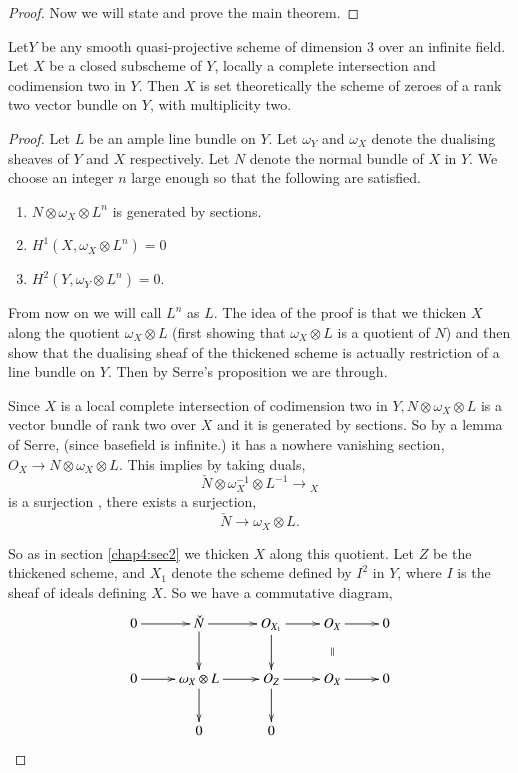 \begin{proof}
Now we will state and prove the main theorem.
\end{proof}

\begin{THM*}
Let\pageoriginale $Y$ be any smooth quasi-projective scheme of
dimension 3 over an infinite field. Let $X$ be a closed subscheme of
$Y$, locally a complete intersection and codimension two in $Y$. Then
$X$ is set theoretically the scheme of zeroes of a rank two vector
bundle on $Y$, with multiplicity two.
\end{THM*}

\begin{proof}
Let $L$ be an ample line bundle on $Y$. Let $\omega_Y$ and $\omega_X$
denote the dualising sheaves of $Y$ and $X$ respectively. Let $N$
denote the normal bundle of $X$ in $Y$. We choose an integer $n$ large
enough so that the following are satisfied. 
\begin{enumerate}
\item $N\otimes\omega_X\otimes L^n$ is generated by sections.
\item $H^1(X,\omega_X\otimes L^n)=0$
\item $H^2(Y,\omega_Y\otimes L^n)=0$.
\end{enumerate}

From now on we will call $L^n$ as $L$. The idea of the proof is that we
thicken $X$ along the quotient $\omega_X\otimes L$ (first showing that
$\omega_X \otimes L$ is a quotient of $N$) and then show that the
dualising sheaf of the thickened scheme is actually restriction of a
line bundle on $Y$. Then by Serre's proposition we are through. 

Since $X$ is a local complete intersection of codimension two in
$Y,N\otimes \omega_X\otimes L$ is a vector bundle of rank two over $X$
and it is generated by sections. So by a lemma of Serre, (since
basefield is infinite.) it has a nowhere vanishing section,
$O_X\longrightarrow N\otimes\omega_X\otimes L$. This implies by taking
duals, 
$$
\check{N}\otimes\omega_X^{-1}\otimes L^{-1}\longrightarrow{}_X
$$
is a surjection \ie, there exists a surjection, 
$$
\check{N}\longrightarrow\omega_X\otimes L.
$$

So as in section \ref{chap4:sec2} we thicken $X$ along this
quotient. Let $Z$ be the thickened scheme, and $X_1$ denote the scheme
defined by $I^2$ in $Y$, where $I$ is the sheaf of\pageoriginale
ideals defining $X$. So we have a commutative diagram, 
\[
\xymatrix{
0 \ar[r] & \check{N}\ar[d]\ar[r] & O_{X_1}\ar[d]\ar[r] & O_X \ar @{}
[d]|{\|} \ar[r] & 0\\
0\ar[r] & \omega_X\otimes L\ar[d]\ar[r] & O_Z\ar[d]\ar[r] & O_X
\ar[r] & 0\\
& 0 & 0 & &
}
\]


\end{proof}
